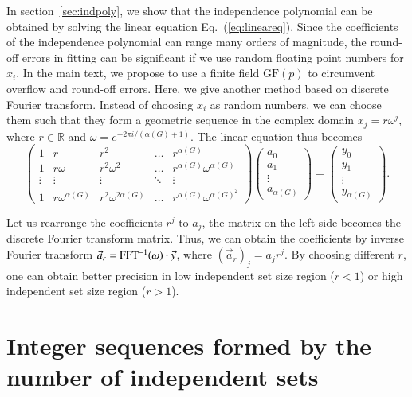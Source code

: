 \documentclass[onefignum, onetabnum]{siamart190516}
\newcommand{\<}{\langle}
\renewcommand{\>}{\rangle}
\newcommand{\Eq}[1]{Eq.~(\ref{#1})}
\begin{document}
In section~\ref{sec:indpoly}, we show that the independence polynomial can be obtained by solving the linear equation \Eq{eq:lineareq}. Since the coefficients of the independence polynomial can range many orders of magnitude, the round-off errors in fitting can be significant if we use random floating point numbers for $x_{i}$.
In the main text, we propose to use a finite field $\text{GF}(p)$ to circumvent overflow and round-off errors. Here, we give another method based on discrete Fourier transform.
Instead of choosing $x_{i}$ as random numbers, we can choose them such that they form a geometric sequence in the complex domain $x_j = r\omega^j$, where $r \in \mathbb{R}$ and $\omega = e^{-2\pi i/( \alpha(G)+1)}$. The linear equation thus becomes
\begin{equation}
\left(\begin{matrix}
1 & r & r^2 & \ldots & r^{\alpha(G)} \\
1 & r\omega & r^2\omega^2 & \ldots & r^{\alpha(G)} \omega^{\alpha(G)} \\
\vdots & \vdots & \vdots &\ddots & \vdots \\
1 & r\omega^{\alpha(G)} & r^2\omega^{2{\alpha(G)}} & \ldots & r^{\alpha(G)}\omega^{{\alpha(G)}^2}
\end{matrix}\right)
\left(\begin{matrix}
a_0 \\ a_1 \\ \vdots \\ a_{\alpha(G)}
\end{matrix}\right)
= \left(\begin{matrix}
y_0 \\ y_1 \\ \vdots \\ y_{\alpha(G)}
\end{matrix}\right).
\end{equation}

Let us rearrange the coefficients $r^j$ to $a_j$, the matrix on the left side becomes the discrete Fourier transform matrix. Thus, we can obtain the coefficients by inverse Fourier transform $\vec a_r = {\rm FFT^{-1}}(\omega) \cdot \vec y$, where $(\vec a_r)_j = a_j r ^j$.
By choosing different $r$, one can obtain better precision in low independent set size region  ($r<1$) or high independent set size region ($r>1$).

\section{Integer sequences formed by the number of independent sets}
\end{document}
